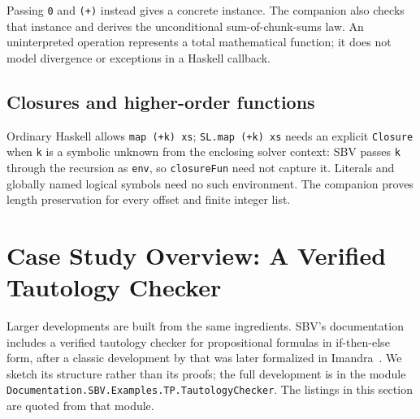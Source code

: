\documentclass[acmsmall,screen,review,anonymous,nonacm]{acmart}
\newcommand{\code}[1]{\texttt{#1}}
\begin{document}
Passing \code{0} and \code{(+)} instead gives a concrete instance. The companion
also checks that instance and derives the unconditional sum-of-chunk-sums law.
An uninterpreted operation represents a total mathematical function; it does
not model divergence or exceptions in a Haskell callback.

\subsection{Closures and higher-order functions}
\label{sec:closures}

Ordinary Haskell allows \code{map (+k) xs}; \code{SL.map (+k) xs} needs an
explicit \code{Closure} when \code{k} is a symbolic unknown from the enclosing
solver context:
SBV passes \code{k} through the recursion as \code{env}, so \code{closureFun}
need not capture it. Literals and globally named logical symbols need no such
environment. The companion proves length preservation for every offset and
finite integer list.

\section{Case Study Overview: A Verified Tautology Checker}
\label{sec:tautology}

Larger developments are built from the same ingredients. SBV's documentation
includes a verified tautology checker for propositional formulas in
if-then-else form, after a classic development by \citet[Chapter~4]{boyermoore} that was
later formalized in Imandra~\citep{imandraTautology}. We sketch its structure
rather than its proofs; the full development is in the module
\code{Documentation.\allowbreak SBV.\allowbreak Examples.\allowbreak TP.\allowbreak TautologyChecker}. The listings in this
section are quoted from that module.
\end{document}
